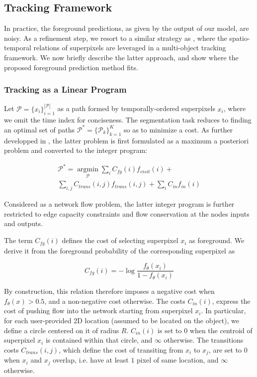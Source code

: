 \subsection{Tracking Framework}
\label{sec:tracking}
In practice, the foreground predictions, as given by the output of our model, are noisy.
As a refinement step, we resort to a similar strategy as \cite{lejeune18}, where the spatio-temporal relations of superpixels are leveraged in a multi-object tracking framework.
We now briefly describe the latter approach, and show where the proposed foreground prediction method fits.


\subsubsection{Tracking as a Linear Program}
\label{sec:orgcf5c794}
Let \(\mathcal{P}=\{x_i\}_{i=1}^{|\mathcal{P}|}\) as a path formed by temporally-ordered superpixels \(x_{i}\), where we omit the time index for conciseness.
The segmentation task reduces to finding an optimal set of paths \(\bm{\mathcal{P}}^*=\{ \mathcal{P}_k\}_{k=1}^K\) so as to minimize a cost.
As further developped in \cite{lejeune18}, the latter problem is first formulated as a maximum a posteriori problem and converted to the integer program:

\begin{multline}
\label{eq:lin_prog}
\bm{\mathcal{P}}^* = \operatorname*{argmin}_{\bm{\mathcal{P}}} \sum_i C_{fg}(i) f_{visit}(i) + \\ \sum_{i,j} C_{trans}(i,j)f_{trans}(i,j) + \sum_{i} C_{in} f_{in}(i)
\label{eq:lin_prog}
\end{multline}

Considered as a network flow problem, the latter integer program is further restricted to edge capacity constraints and flow conservation at the nodes inputs and outputs.

The term $C_{fg}(i)$ defines the cost of selecting superpixel $x_i$ as foreground.
We derive it from the foreground probability of the corresponding superpixel as

\begin{equation}
  \label{eq:cost_fg}
  C_{fg}(i) = -\log \frac{f_\theta(x_i)}{1-f_\theta(x_i)}
\end{equation}

By construction, this relation therefore imposes a negative cost when $f_{\theta}(x) > 0.5$, and a non-negative cost otherwise.
The costs $C_{in}(i)$, express the cost of pushing flow into the network starting from superpixel $x_{i}$.
In particular, for each user-provided 2D location (assumed to be located on the object), we define a circle centered on it of radius $R$.
$C_{in}(i)$ is set to $0$ when the centroid of superpixel $x_i$ is contained within that circle, and $\infty$ otherwise.
The transitions costs $C_{trans}(i,j)$, which define the cost of transiting from $x_i$ to $x_j$, are set to $0$ when $x_i$ and $x_j$ overlap, i.e. have at least $1$ pixel of same location, and $\infty$ otherwise.

